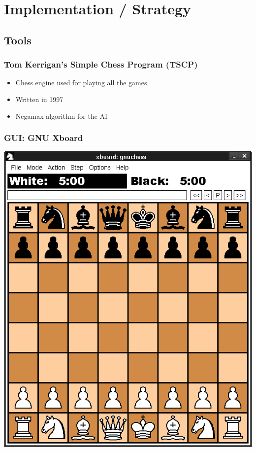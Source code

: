 \documentclass{beamer}
\begin{document}
\section{Implementation / Strategy}
\begin{frame}
\tableofcontents[currentsection]
\end{frame}

\begin{frame}
\subsection{Tools}
\frametitle{Tom Kerrigan's Simple Chess Program (TSCP)}
\begin{itemize}
\item Chess engine used for playing all the games
\item Written in 1997
\item Negamax algorithm for the AI
\end{itemize}
\end{frame}

\begin{frame}
\frametitle{GUI: GNU Xboard}
\begin{center}
\includegraphics[scale=0.3]{images/xboard_view.png}
\end{center}
\end{frame}
\end{document}
